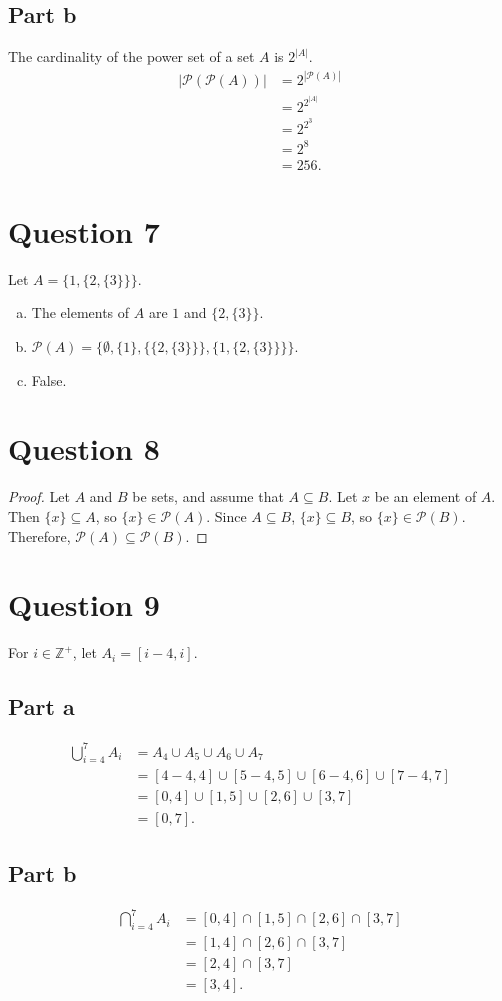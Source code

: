 \documentclass{article}
\begin{document}
\subsection*{Part b}
The cardinality of the power set of a set $A$ is $2^{|A|}$.
\begin{align*}
    |\mathcal{P}(\mathcal{P}(A))| &= 2^{|\mathcal{P}(A)|} \\
    &= 2^{2^{|A|}} \\
    &= 2^{2^3} \\
    &= 2^8 \\
    &= 256.
\end{align*}

\section*{Question 7}
Let $A = \{1, \{2, \{3\}\}\}$.
\begin{enumerate}[(a)]
    \item The elements of $A$ are $1$ and $\{2, \{3\}\}$.
    \item $\mathcal{P}(A) = \{\emptyset, \{1\}, \{\{2, \{3\}\}\}, \{1, \{2, \{3\}\}\}\}$.
    \item False.
\end{enumerate}

\section*{Question 8}
\begin{proof}
    Let $A$ and $B$ be sets, and assume that $A \subseteq B$.
    Let $x$ be an element of $A$.
    Then $\{x\} \subseteq A$, so $\{x\} \in \mathcal{P}(A)$.
    Since $A \subseteq B$, $\{x\} \subseteq B$, so $\{x\} \in \mathcal{P}(B)$.
    Therefore, $\mathcal{P}(A) \subseteq \mathcal{P}(B)$.
\end{proof}

\section*{Question 9}
For $i \in \mathbb{Z}^+$, let $A_i = [i-4, i]$.

\subsection*{Part a}
\begin{align*}
    \bigcup_{i=4}^{7} A_i &= A_4 \cup A_5 \cup A_6 \cup A_7 \\
    &= [4-4, 4] \cup [5-4, 5] \cup [6-4, 6] \cup [7-4, 7] \\
    &= [0, 4] \cup [1, 5] \cup [2, 6] \cup [3, 7] \\
    &= [0, 7].
\end{align*}

\subsection*{Part b}
\begin{align*}
    \bigcap_{i=4}^{7} A_i &= [0, 4] \cap [1, 5] \cap [2, 6] \cap [3, 7] \\
    &= [1, 4] \cap [2, 6] \cap [3, 7] \\
    &= [2, 4] \cap [3, 7] \\
    &= [3, 4].
\end{align*}
\end{document}
